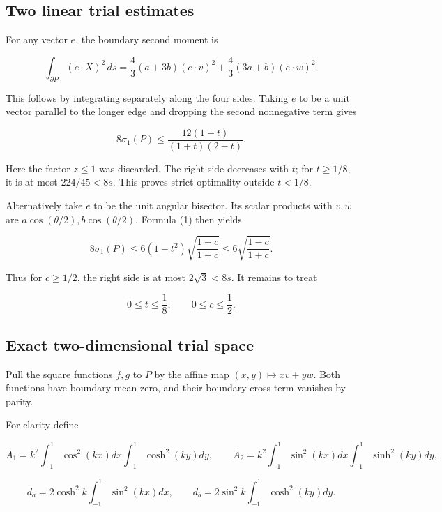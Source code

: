 \documentclass[11pt,a4paper]{article}
\begin{document}
\hypertarget{022-two-linear-trial-estimates}{%
\subsection{Two linear trial
estimates}\label{022-two-linear-trial-estimates}}

For any vector \(e\), the boundary second moment is

\[
\int_{\partial P}(e\cdot X)^2\,ds
=\frac43(a+3b)(e\cdot v)^2
 +\frac43(3a+b)(e\cdot w)^2.
\tag{1}
\]

This follows by integrating separately along the four sides. Taking
\(e\) to be a unit vector parallel to the longer edge and dropping the
second nonnegative term gives

\[
8\sigma_1(P)
\le\frac{12(1-t)}{(1+t)(2-t)}.
\tag{2}
\]

Here the factor \(z\le 1\) was discarded. The right side decreases with
\(t\); for \(t\ge 1/8\), it is at most \(224/45<8s\). This proves strict
optimality outside \(t<1/8\).

Alternatively take \(e\) to be the unit angular bisector. Its scalar
products with \(v,w\) are \(a \cos (\theta /2), b \cos (\theta /2)\). Formula (1)
then yields

\[
8\sigma_1(P)
\le 6(1-t^2)\sqrt{\frac{1-c}{1+c}}
\le6\sqrt{\frac{1-c}{1+c}}.
\tag{3}
\]

Thus for \(c\ge 1/2\), the right side is at most \(2\sqrt3<8s\). It remains
to treat

\[
0\le t\le\frac18,\qquad 0\le c\le\frac12.
\tag{4}
\]

\hypertarget{022-exact-two-dimensional-trial-space}{%
\subsection{Exact two-dimensional trial
space}\label{022-exact-two-dimensional-trial-space}}

Pull the square functions \(f,g\) to \(P\) by the affine map
\((x,y)\mapsto xv+yw\). Both functions have boundary mean zero, and
their boundary cross term vanishes by parity.

For clarity define

\[
A_1=k^2\!\int_{-1}^1\!\cos^2(kx)dx
             \int_{-1}^1\!\cosh^2(ky)dy,
\qquad
A_2=k^2\!\int_{-1}^1\!\sin^2(kx)dx
             \int_{-1}^1\!\sinh^2(ky)dy,
\]

\[
d_a=2\cosh^2 k\int_{-1}^1\sin^2(kx)dx,
\qquad
d_b=2\sin^2 k\int_{-1}^1\cosh^2(ky)dy.
\]
\end{document}

